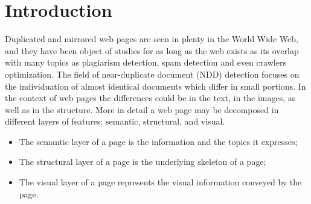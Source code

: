 \documentclass{easychair}
\begin{document}
\section{Introduction}
\label{sect:Introduction}

Duplicated and mirrored web pages are seen in plenty in the World Wide Web, and they have been object of studies for as long as the web exists as its overlap with many topics as plagiarism detection, spam detection and even crawlers optimization. The field of near-duplicate document (NDD) detection focuses on the individuation of almost identical documents which differ in small portions. In the context of web pages the differences could be in the text, in the images, as well as in the structure. More in detail a web page may be decomposed in different layers of features: semantic, structural, and visual. 
\begin{itemize}
  \item The semantic layer of a page is the information and the topics it expresses;
  \item The structural layer of a page is the underlying skeleton of a page;
  \item The visual layer of a page represents the visual information conveyed by the page.
\end{itemize}
\end{document}
